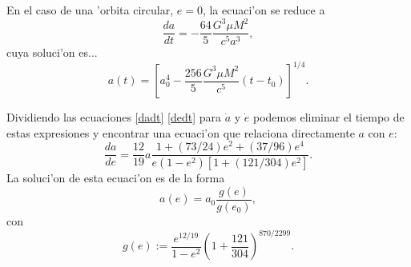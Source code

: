 En el caso de una 'orbita circular, $e=0$, la ecuaci'on se reduce a
\begin{equation}
\frac{da}{dt} = -\frac{64}{5}\frac{G^3\mu M^2}{c^5a^3},
\end{equation}
cuya soluci'on es...
\begin{equation}
a(t) = \left[a_0^4-\frac{256}{5}\frac{G^3\mu M^2}{c^5}(t-t_0)\right]^{1/4}.
\end{equation}

Dividiendo las ecuaciones \eqref{dadt} \eqref{dedt} para $\dot{a}$ y $\dot{e}$ podemos eliminar el tiempo de estas expresiones y encontrar una ecuaci'on que relaciona directamente $a$ con $e$:
\begin{equation}
\frac{da}{de}=\frac{12}{19}a\frac{1+(73/24)e^2+(37/96)e^4}{e(1-e^2)[1+(121/304)e^2]}.
\end{equation}
La soluci'on de esta ecuaci'on es de la forma
\begin{equation}
a(e)=a_{0}\frac{g(e)}{g(e_{0})},
\end{equation}
con 
\begin{equation}
g(e):= \frac{e^{12/19}}{1-e^2}\left(1+\frac{121}{304} \right)^{870/2299}.
\end{equation}

